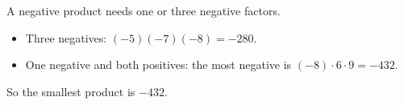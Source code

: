 A negative product needs one or three negative factors.
\begin{itemize}
\item Three negatives: $(-5)(-7)(-8)=-280$.
\item One negative and both positives: the most negative is $(-8)\cdot6\cdot9=-432$.
\end{itemize}
So the smallest product is $\boxed{-432}$.
